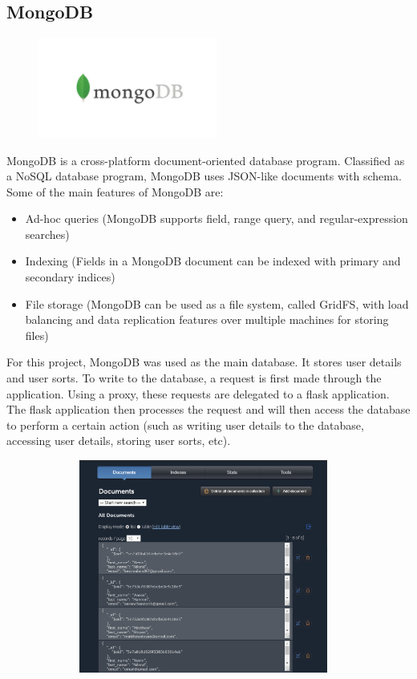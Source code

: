 \newpage
\subsection{MongoDB}
\par
\medskip
\begin{center}
    \includegraphics[width=8cm,height=3.3cm,keepaspectratio]{images/mongodb}
\end{center}
MongoDB is a cross-platform document-oriented database program. Classified as a
NoSQL database program, MongoDB uses JSON-like documents with schema. Some of 
the main features of MongoDB are:

\begin{itemize}
    \item Ad-hoc queries (MongoDB supports field, range query, and
    regular-expression searches)
    \item Indexing (Fields in a MongoDB document can be indexed with primary and
    secondary indices)
    \item File storage (MongoDB can be used as a file system, called GridFS,
    with load balancing and data replication features over multiple machines for
    storing files)  
\end{itemize}

For this project, MongoDB was used as the main database. It stores user details
and user sorts. To write to the database, a request is first made through the 
application. Using a proxy, these requests are delegated to a flask application.
The flask application then processes the request and will then access the 
database to perform a certain action (such as writing user details to the 
database, accessing user details, storing user sorts, etc). 

\begin{center}
    \includegraphics[width=13cm,height=7cm,keepaspectratio]{images/mlab}
\end{center}

